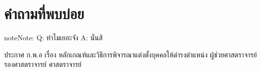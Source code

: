 \documentclass[a4paper,12pt,english]{sphinxmanual}
\begin{document}
\chapter{คำถามที่พบบ่อย}
\label{\detokenize{faq:id1}}\label{\detokenize{faq::doc}}
\begin{sphinxadmonition}{note}{Note:}
Q: ทำไมเยอะจัง
A: นั่นสิ
\end{sphinxadmonition}

ประกาศ ก.พ.อ เรื่อง หลักเกณฑ์และวิธีการพิจารณาแต่งตั้งบุคคลให้ดำรงตำแหน่ง ผู้ช่วยศาสตราจารย์ รองศาสตราจารย์ ศาสตราจารย์




\renewcommand{\indexname}{Index}
\printindex
\end{document}
